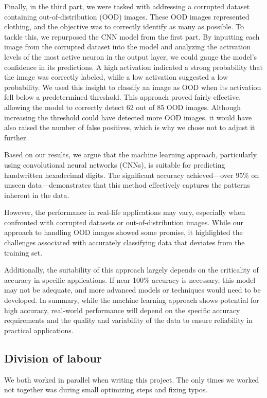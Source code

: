 \documentclass{article}
\begin{document}
Finally, in the third part, we were tasked with addressing a corrupted dataset containing out-of-distribution (OOD) images. These OOD images represented clothing, and the objective was to correctly identify as many as possible. To tackle this, we repurposed the CNN model from the first part. By inputting each image from the corrupted dataset into the model and analyzing the activation levels of the most active neuron in the output layer, we could gauge the model’s confidence in its predictions. A high activation indicated a strong probability that the image was correctly labeled, while a low activation suggested a low probability. We used this insight to classify an image as OOD when its activation fell below a predetermined threshold. This approach proved fairly effective, allowing the model to correctly detect 62 out of 85 OOD images. Although increasing the threshold could have detected more OOD images, it would have also raised the number of false positives, which is why we chose not to adjust it further.

Based on our results, we argue that the machine learning approach, particularly using convolutional neural networks (CNNs), is suitable for predicting handwritten hexadecimal digits. The significant accuracy achieved—over 95\% on unseen data—demonstrates that this method effectively captures the patterns inherent in the data.

However, the performance in real-life applications may vary, especially when confronted with corrupted datasets or out-of-distribution images. While our approach to handling OOD images showed some promise, it highlighted the challenges associated with accurately classifying data that deviates from the training set.

Additionally, the suitability of this approach largely depends on the criticality of accuracy in specific applications. If near 100\% accuracy is necessary, this model may not be adequate, and more advanced models or techniques would need to be developed. In summary, while the machine learning approach shows potential for high accuracy, real-world performance will depend on the specific accuracy requirements and the quality and variability of the data to ensure reliability in practical applications.


\subsection{Division of labour}

We both worked in parallel when writing this project. The only times we worked not together was during small optimizing steps and fixing typos.
\end{document}
